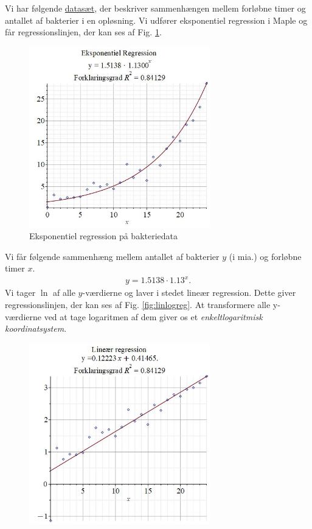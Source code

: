 \begin{exa}
	Vi har følgende \href{https://github.com/ChristianJLex/TeachingNotes/raw/master/2022-2023/Data%20og%20lign/Bakterier.xlsx}{\color{blue!60}datasæt}, der beskriver sammenhængen mellem forløbne timer og antallet af bakterier i en opløsning. 
	Vi udfører eksponentiel regression i Maple og får regressionslinjen, der kan ses af Fig. \ref{fig:expreg}.
	\begin{figure}[H]
		\centering
		\includegraphics[width=0.7\textwidth]{Billeder/bakterieexpreg.jpg}
		\caption{Eksponentiel regression på bakteriedata}
		\label{fig:expreg}
	\end{figure}
	Vi får følgende sammenhæng mellem antallet af bakterier $y$ (i mia.) og forløbne timer $x$.
	\begin{align*}
		y = 1.5138\cdot 1.13^x.
	\end{align*}
	Vi tager $\ln$ af alle $y$-værdierne og laver i stedet lineær regression. Dette giver regressionslinjen, der kan ses af Fig. \ref{fig:linlogreg}.
	At transformere alle y-værdierne ved at tage logaritmen af dem giver os et \textit{enkeltlogaritmisk koordinatsystem}.
	\begin{figure}[H]
		\centering
		\includegraphics[width=0.7\textwidth]{Billeder/bakterielinreg.jpg}

\end{figure}
\end{exa}
